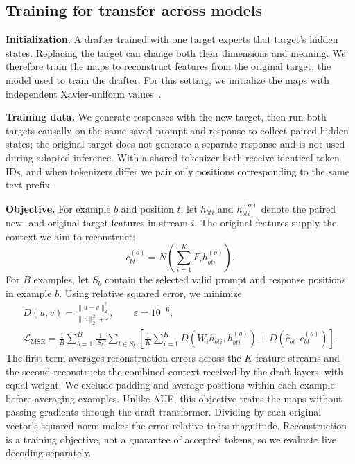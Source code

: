 \subsection{Training for transfer across models}
\label{sec:method-mse}
\textbf{Initialization.} A drafter trained with one target expects that target's hidden states. Replacing the target can change both their dimensions and meaning. We therefore train the maps to reconstruct features from the original target, the model used to train the drafter. For this setting, we initialize the maps with independent Xavier-uniform values~\citep{glorot2010initialization}.

\textbf{Training data.} We generate responses with the new target, then run both targets causally on the same saved prompt and response to collect paired hidden states; the original target does not generate a separate response and is not used during adapted inference. With a shared tokenizer both receive identical token IDs, and when tokenizers differ we pair only positions corresponding to the same text prefix.

\textbf{Objective.} For example $b$ and position $t$, let $h_{bti}$ and $h^{(o)}_{bti}$ denote the paired new- and original-target features in stream $i$. The original features supply the context we aim to reconstruct:
\begin{equation}
 c^{(o)}_{bt}=N\!\left(\sum_{i=1}^{K}F_i h^{(o)}_{bti}\right).
 \label{eq:original-context}
\end{equation}
For $B$ examples, let $S_b$ contain the selected valid prompt and response positions in example $b$. Using relative squared error, we minimize
\begin{gather}
 D(u,v)=\frac{\lVert u-v\rVert_2^2}{\lVert v\rVert_2^2+\varepsilon},
 \qquad \varepsilon=10^{-6},
 \label{eq:relative-error}\\
 \mathcal L_{\mathrm{MSE}}
 =\frac1B\sum_{b=1}^{B}\frac1{|S_b|}\sum_{t\in S_b}
 \left[\frac1K\sum_{i=1}^{K}D(W_i h_{bti},h^{(o)}_{bti})
 +D(\widehat c_{bt},c^{(o)}_{bt})\right].
 \label{eq:mse-method}
\end{gather}
The first term averages reconstruction errors across the $K$ feature streams and the second reconstructs the combined context received by the draft layers, with equal weight. We exclude padding and average positions within each example before averaging examples. Unlike AUF, this objective trains the maps without passing gradients through the draft transformer. Dividing by each original vector's squared norm makes the error relative to its magnitude. Reconstruction is a training objective, not a guarantee of accepted tokens, so we evaluate live decoding separately.

